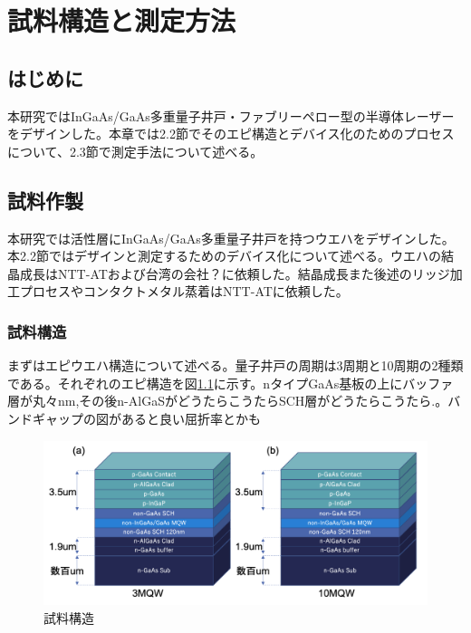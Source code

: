 
\chapter{試料構造と測定方法}%

\section{はじめに}%
本研究ではInGaAs/GaAs多重量子井戸・ファブリーペロー型の半導体レーザーをデザインした。本章では2.2節でそのエピ構造とデバイス化のためのプロセスについて、2.3節で測定手法について述べる。

\section{試料作製}%
本研究では活性層にInGaAs/GaAs多重量子井戸を持つウエハをデザインした。本2.2節ではデザインと測定するためのデバイス化について述べる。ウエハの結晶成長はNTT-ATおよび台湾の会社？に依頼した。結晶成長また後述のリッジ加工プロセスやコンタクトメタル蒸着はNTT-ATに依頼した。

\subsection{試料構造}%
まずはエピウエハ構造について述べる。量子井戸の周期は3周期と10周期の2種類である。それぞれのエピ構造を図\ref{fig:sample_structure}に示す。nタイプGaAs基板の上にバッファ層が丸々nm,その後n-AlGaSがどうたらこうたらSCH層がどうたらこうたら.。バンドギャップの図があると良い屈折率とかも
\begin{figure}[htbp]
	\includegraphics[width=15cm]{figure/fig_sample_structure}
	\caption{試料構造}
	\label{fig:sample_structure}
\end{figure}



